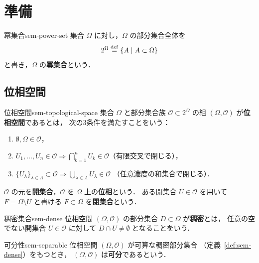 \chapter{準備}
\label{ch:seminar-00}

\begin{definition}{冪集合}{sem-power-set}
  集合 $\Omega$ に対し，$\Omega$ の部分集合全体を
  \[
    2^{\Omega} \overset{\mathrm{def}}{=} \{A \mid A \subset \Omega\}
  \]
  と書き，$\Omega$ の\textbf{冪集合}という．
\end{definition}

\section{位相空間}
\label{sec:sem-topology}

\begin{definition}{位相空間}{sem-topological-space}
  集合 $\Omega$ と部分集合族 $\mathcal{O} \subset 2^{\Omega}$ の組
  $(\Omega, \mathcal{O})$ が\textbf{位相空間}であるとは，
  次の3条件を満たすことをいう：
  \begin{enumerate}
    \item[(i)] $\emptyset, \Omega \in \mathcal{O}$，
    \item[(ii)] $U_1, \ldots, U_n \in \mathcal{O} \Longrightarrow
      \bigcap_{k=1}^{n} U_k \in \mathcal{O}$（有限交叉で閉じる），
    \item[(iii)] $\{U_\lambda\}_{\lambda \in \Lambda} \subset \mathcal{O}
      \Longrightarrow \bigcup_{\lambda \in \Lambda} U_\lambda \in \mathcal{O}$
      （任意濃度の和集合で閉じる）．
  \end{enumerate}
  $\mathcal{O}$ の元を\textbf{開集合}，$\mathcal{O}$ を $\Omega$ 上の\textbf{位相}という．
  ある開集合 $U \in \mathcal{O}$ を用いて $F = \Omega \setminus U$ と書ける
  $F \subset \Omega$ を\textbf{閉集合}という．
\end{definition}

\begin{definition}{稠密集合}{sem-dense}
  位相空間 $(\Omega, \mathcal{O})$ の部分集合 $D \subset \Omega$ が\textbf{稠密}とは，
  任意の空でない開集合 $U \in \mathcal{O}$ に対して $D \cap U \neq \emptyset$
  となることをいう．
\end{definition}

\begin{definition}{可分性}{sem-separable}
  位相空間 $(\Omega, \mathcal{O})$ が可算な稠密部分集合
  （定義~\ref{def:sem-dense}）をもつとき，
  $(\Omega, \mathcal{O})$ は\textbf{可分}であるという．
\end{definition}

